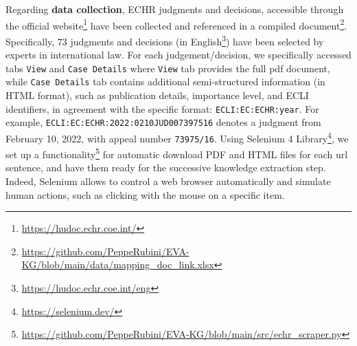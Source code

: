 \documentclass[runningheads]{llncs}
\begin{document}
Regarding \textbf{data collection}, ECHR judgments and decisions, accessible through the official website\footnote{\url{https://hudoc.echr.coe.int/}} have been collected and referenced in a compiled document\footnote{\url{https://github.com/PeppeRubini/EVA-KG/blob/main/data/mapping_doc_link.xlsx}}. %
Specifically, %
$73$ judgments and decisions (in English\footnote{ \url{https://hudoc.echr.coe.int/eng}}) %
have been selected by experts in international law. %
For each %
judgement/decision, %
we specifically accessed %
tabs %
\texttt{View} and \texttt{Case Details} where %
\texttt{View} tab provides the full pdf document, while %
\texttt{Case Details} tab contains additional semi-structured information (in HTML format), such as publication details, importance level, and ECLI identifiers, in agreement with the %
specific format: \texttt{ECLI:EC:ECHR:year}. 
For example, \texttt{ECLI:EC:ECHR:2022:0210JUD007397516} denotes a judgment from February 10, 2022, with appeal number \texttt{73975/16}. 
Using Selenium 4 Library\footnote{\url{https://selenium.dev/}}, we set up a functionality\footnote{\url{https://github.com/PeppeRubini/EVA-KG/blob/main/src/echr_scraper.py}} for automatic download 
PDF and HTML files for each url sentence,  %
and have them ready for the successive knowledge extraction step. Indeed, Selenium allows to control a web browser automatically and simulate human actions, such as clicking with the mouse on a specific item. %
\end{document}
